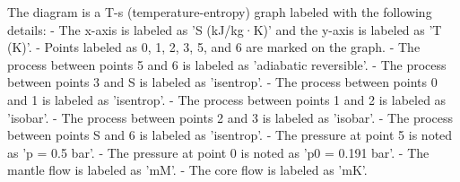 The diagram is a T-s (temperature-entropy) graph labeled with the following details:  
- The x-axis is labeled as 'S (kJ/kg·K)' and the y-axis is labeled as 'T (K)'.  
- Points labeled as 0, 1, 2, 3, 5, and 6 are marked on the graph.  
- The process between points 5 and 6 is labeled as 'adiabatic reversible'.  
- The process between points 3 and S is labeled as 'isentrop'.  
- The process between points 0 and 1 is labeled as 'isentrop'.  
- The process between points 1 and 2 is labeled as 'isobar'.  
- The process between points 2 and 3 is labeled as 'isobar'.  
- The process between points S and 6 is labeled as 'isentrop'.  
- The pressure at point 5 is noted as 'p = 0.5 bar'.  
- The pressure at point 0 is noted as 'p0 = 0.191 bar'.  
- The mantle flow is labeled as 'mM'.  
- The core flow is labeled as 'mK'.